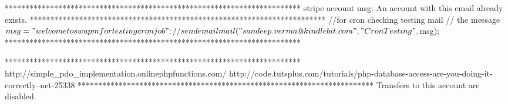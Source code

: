 {{{{************************************************************************
stripe account msg: An account with this email already exists.
************************************************************************
//for cron checking testing mail
// the message
$msg = "welcome to swapm for testing cron job";
// send email
mail("sandeep.verma@kindlebit.com","Cron Testing",$msg);
************************************************************************

************************************************************************
http://simple_pdo_implementation.onlinephpfunctions.com/
http://code.tutsplus.com/tutorials/php-database-access-are-you-doing-it-correctly--net-25338
************************************************************************
Transfers to this account are disabled.

}}}}

